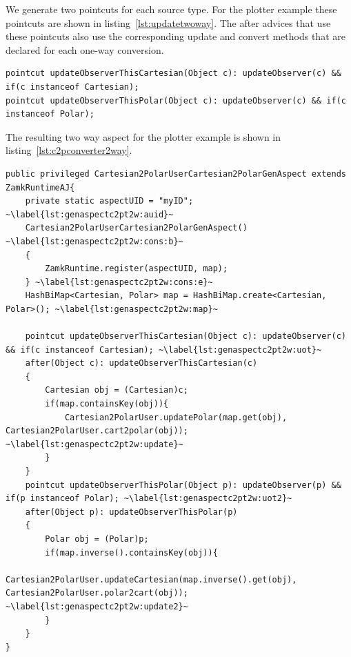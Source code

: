 We generate two  pointcuts for each source type. For the plotter example these pointcuts are shown in listing~\ref{lst:updatetwoway}. The after advices that use these pointcuts also use the corresponding update and convert methods that are declared for each one-way conversion. 

\begin{lstlisting}[float, caption={\lstinln{updateObserverThis} pointcuts for two-way conversion}, label={lst:updatetwoway}]
pointcut updateObserverThisCartesian(Object c): updateObserver(c) && if(c instanceof Cartesian);
pointcut updateObserverThisPolar(Object c): updateObserver(c) && if(c instanceof Polar);
\end{lstlisting}

The resulting two way aspect for the plotter example is shown in listing~\ref{lst:c2pconverter2way}.
\begin{lstlisting}[float, caption={The aspect generated for the Cartesian to Polar two-way converter}, label={lst:c2pconverter2way}]
public privileged Cartesian2PolarUserCartesian2PolarGenAspect extends ZamkRuntimeAJ{
	private static aspectUID = "myID"; ~\label{lst:genaspectc2pt2w:auid}~
	Cartesian2PolarUserCartesian2PolarGenAspect() ~\label{lst:genaspectc2pt2w:cons:b}~
	{
		ZamkRuntime.register(aspectUID, map);
	} ~\label{lst:genaspectc2pt2w:cons:e}~
	HashBiMap<Cartesian, Polar> map = HashBiMap.create<Cartesian, Polar>(); ~\label{lst:genaspectc2pt2w:map}~
	
	pointcut updateObserverThisCartesian(Object c): updateObserver(c) && if(c instanceof Cartesian); ~\label{lst:genaspectc2pt2w:uot}~
	after(Object c): updateObserverThisCartesian(c)
	{
		Cartesian obj = (Cartesian)c;
		if(map.containsKey(obj)){
			Cartesian2PolarUser.updatePolar(map.get(obj), Cartesian2PolarUser.cart2polar(obj)); ~\label{lst:genaspectc2pt2w:update}~
		}	
	}
	pointcut updateObserverThisPolar(Object p): updateObserver(p) && if(p instanceof Polar); ~\label{lst:genaspectc2pt2w:uot2}~
	after(Object p): updateObserverThisPolar(p)
	{
		Polar obj = (Polar)p;
		if(map.inverse().containsKey(obj)){
			Cartesian2PolarUser.updateCartesian(map.inverse().get(obj), Cartesian2PolarUser.polar2cart(obj)); ~\label{lst:genaspectc2pt2w:update2}~
		}	
	}
}
\end{lstlisting}



